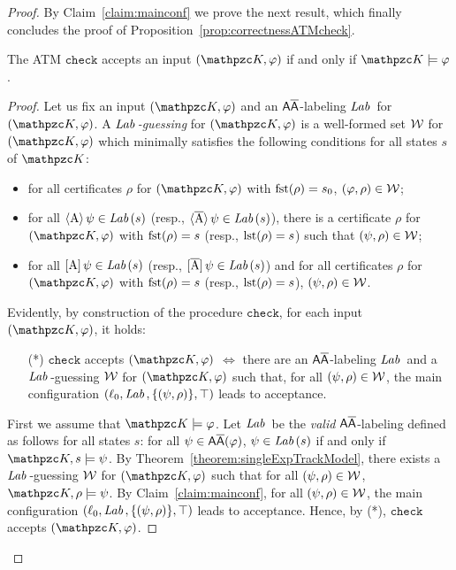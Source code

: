\begin{proof}
By Claim~\ref{claim:mainconf} we prove the next result, which finally concludes the proof of Proposition~\ref{prop:correctnessATMcheck}.

\begin{claim}
 The ATM $\texttt{check}$ accepts an input $(\Ku,\varphi)$ if and only if $\Ku\models \varphi$.
\end{claim}
\begin{proof}
Let us fix an input $(\Ku,\varphi)$ and an $\mathsf{A\overline{A}}$-labeling $\textit{Lab}\,$ for $(\Ku,\varphi)$. A \emph{$\textit{Lab}\,$-guessing} for $(\Ku,\varphi)$
is a well-formed set ${\mathcal{W}}$ for $(\Ku,\varphi)$  which minimally satisfies the following conditions for all states $s$ of $\Ku$:
\begin{itemize}
  \item for  all certificates $\rho$ for $(\Ku,\varphi)$ with $\operatorname{fst}(\rho)=s_0$, $(\varphi,\rho)\in{\mathcal{W}}$;
  \item for all $\operatorname{\langle A\rangle}\psi\in \textit{Lab}\,(s)$ (resp., $\operatorname{\langle \overline{A}\rangle}\psi\in \textit{Lab}\,(s)$), there is a certificate
  $\rho$ for $(\Ku,\varphi)$ with $\operatorname{fst}(\rho)=s$ (resp., $\operatorname{lst}(\rho)=s$) such that $(\psi,\rho)\in{\mathcal{W}}$;
  \item for all $\operatorname{\mathopen[ A \mathclose]}\psi\in \textit{Lab}\,(s)$ (resp., $\operatorname{\mathopen[ \overline{A} \mathclose]}\psi\in \textit{Lab}\,(s)$) and for all certificates
  $\rho$ for $(\Ku,\varphi)$ with $\operatorname{fst}(\rho)=s$ (resp., $\operatorname{lst}(\rho)=s$), $(\psi,\rho)\in{\mathcal{W}}$.
\end{itemize}
%
Evidently, by construction of the procedure $\texttt{check}$, for each input $(\Ku,\varphi)$, it holds:
\begin{itemize}
  \item[(*)] $\texttt{check}$ accepts $(\Ku,\varphi)$ $\Longleftrightarrow$ there are an $\mathsf{A\overline{A}}$-labeling $\textit{Lab}\,$ and a $\textit{Lab}\,$-guessing ${\mathcal{W}}$  for $(\Ku,\varphi)$
    such that, for all $(\psi,\rho)\in {\mathcal{W}}$, the main configuration $(\ell_0,\textit{Lab}\,,\allowbreak \{(\psi,\rho)\},\operatorname{\top})$ leads to acceptance.
\end{itemize}

First we assume that $\Ku\models \varphi$.  Let $\textit{Lab}\,$ be the \emph{valid} $\mathsf{A\overline{A}}$-labeling defined as follows for all states $s$: for all $\psi\in\mathsf{A\overline{A}}(\varphi)$,
$\psi\in \textit{Lab}\,(s)$ if and only if $\Ku,s\models \psi$. By Theorem~\ref{theorem:singleExpTrackModel}, there exists a $\textit{Lab}\,$-guessing ${\mathcal{W}}$  for $(\Ku,\varphi)$
such that for all $(\psi,\rho)\in {\mathcal{W}}$, $\Ku,\rho\models \psi$. By Claim~\ref{claim:mainconf}, for all $(\psi,\rho)\in {\mathcal{W}}$, the main configuration $(\ell_0,\textit{Lab}\,,\{(\psi,\rho)\},\operatorname{\top})$ leads to acceptance. Hence, by (*), $\texttt{check}$ accepts $(\Ku,\varphi)$.


\end{proof}
\end{proof}
